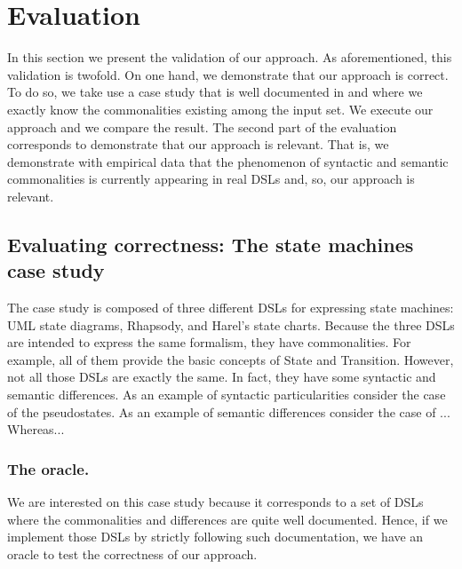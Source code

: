 \section{Evaluation}
\label{sec:validation}

In this section we present the validation of our approach. As aforementioned, this validation is twofold. On one hand, we demonstrate that our approach is correct. To do so, we take use a case study that is well documented in \cite{Crane:2007} and where we exactly know the commonalities existing among the input set. We execute our approach and we compare the result. The second part of the evaluation corresponds to demonstrate that our approach is relevant. That is, we demonstrate with empirical data that the phenomenon of syntactic and semantic commonalities is currently appearing in real DSLs and, so, our approach is relevant. 

\subsection{Evaluating correctness: The state machines case study}

The case study is composed of three different DSLs for expressing state machines: UML state diagrams, Rhapsody, and Harel's state charts. Because the three DSLs are intended to express the same formalism, they have commonalities. For example, all of them provide the basic concepts of State and Transition. However, not all those DSLs are exactly the same. In fact, they have some syntactic and semantic differences. As an example of syntactic particularities consider the case of the pseudostates. As an example of semantic differences consider the case of ... Whereas... 

\subsubsection{The oracle.} We are interested on this case study because it corresponds to a set of DSLs where the commonalities and differences are quite well documented. Hence, if we implement those DSLs by strictly following such documentation, we have an oracle to test the correctness of our approach. 


